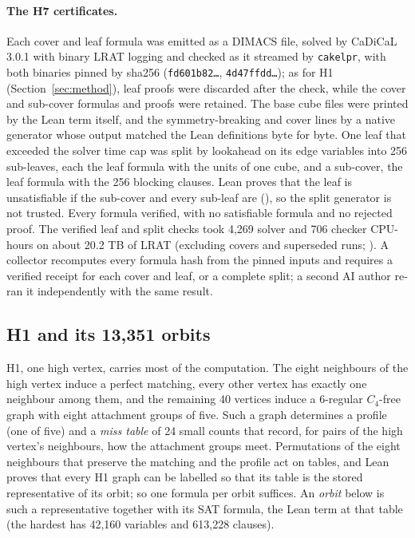 \documentclass{anvil-paper}
\newcommand{\repobase}{https://github.com/rjwalters/lean-genius/blob/fa2b41268df024128ed4738b3bb500637cf1ec12}
\newcommand{\repofile}[2]{\href{\repobase/#1}{\lean{#2}}}
\newcommand{\rp}{research/problems/erdos-85-wip-01}
\newcommand{\cakelpr}{\texttt{cake\textunderscore lpr}}
\theoremstyle{definition}
\begin{document}
\paragraph{The H7 certificates.} Each cover and leaf formula was emitted as a DIMACS file, solved by CaDiCaL 3.0.1 \citep{biere2020cadical,biere2024cadical2} with binary LRAT logging and checked as it streamed by \cakelpr{}, with both binaries pinned by sha256 (\texttt{fd601b82\ldots}, \texttt{4d47ffdd\ldots}); as for H1 (Section~\ref{sec:method}), leaf proofs were discarded after the check, while the cover and sub-cover formulas and proofs were retained. The base cube files were printed by the Lean term itself, and the symmetry-breaking and cover lines by a native generator whose output matched the Lean definitions byte for byte. One leaf that exceeded the solver time cap was split by lookahead on its edge variables into 256 sub-leaves, each the leaf formula with the units of one cube, and a sub-cover, the leaf formula with the 256 blocking clauses. Lean proves that the leaf is unsatisfiable if the sub-cover and every sub-leaf are (), so the split generator is not trusted. Every formula verified, with no satisfiable formula and no rejected proof. The verified leaf and split checks took 4,269 solver and 706 checker CPU-hours on about 20.2 TB of LRAT (excluding covers and superseded runs; \repofile{\rp/h7_hsb_campaign_20261008/receipts/collected/campaign_totals.json}{campaign totals}). A collector recomputes every formula hash from the pinned inputs and requires a verified receipt for each cover and leaf, or a complete split; a second AI author re-ran it independently with the same result.

\subsection{H1 and its 13,351 orbits}\label{sec:h1-structure}

H1, one high vertex, carries most of the computation. The eight neighbours of the high vertex induce a perfect matching, every other vertex has exactly one neighbour among them, and the remaining 40 vertices induce a 6-regular $C_4$-free graph with eight attachment groups of five. Such a graph determines a profile (one of five) and a \emph{miss table} of 24 small counts that record, for pairs of the high vertex's neighbours, how the attachment groups meet. Permutations of the eight neighbours that preserve the matching and the profile act on tables, and Lean proves that every H1 graph can be labelled so that its table is the stored representative of its orbit; so one formula per orbit suffices. An \emph{orbit} below is such a representative together with its SAT formula, the Lean term  at that table (the hardest has 42,160 variables and 613,228 clauses).
\end{document}
